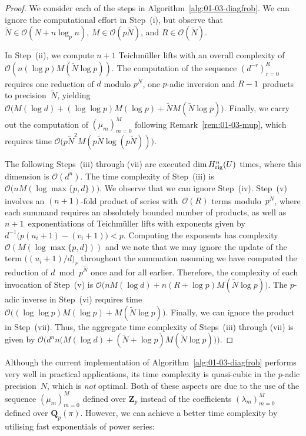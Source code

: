 \begin{proof}
We consider each of the steps in Algorithm~\ref{alg:01-03-diagfrob}. 
We can ignore the computational effort in {Step~(i)}, but observe 
that $\tilde{N} \in \mathcal{O}(N + n \log_p n)$, 
$M \in \mathcal{O}(p \tilde{N})$, and $R \in \mathcal{O}(\tilde{N})$.  

In {Step~(ii)}, we compute $n+1$ Teichm\"uller lifts with an 
overall complexity of $\mathcal{O}(n (\log p) M(\tilde{N} \log p))$. 
The computation of the sequence $(d^{-r})_{r=0}^{R}$ requires 
one reduction of $d$ modulo $p^{\tilde{N}}$, one $p$-adic inversion 
and $R-1$~products to precision~$\tilde{N}$, yielding 
$\mathcal{O}\bigl(M(\log d) + (\log \log p) M(\log p) + \tilde{N} M(\tilde{N} \log p)\bigr)$. 
Finally, we carry out the computation of $(\mu_m)_{m=0}^{M}$ following 
Remark~\ref{rem:01-03-mup}, which requires time 
$\mathcal{O}\bigl(p \tilde{N}^2 M(p \tilde{N} \log(p \tilde{N}))\bigr)$.

The following {Steps~(iii) through (vii)} are executed 
$\dim H_{\text{rig}}^{n}(U)$ times, where this dimension 
is $\mathcal{O}(d^n)$.
The time complexity of {Step~(iii)} is 
$\mathcal{O}\bigl(n M(\log \max\{p,d\})\bigr)$.
We observe that we can ignore {Step~(iv)}.
Step~(v) involves an $(n+1)$-fold product of series 
with~$\mathcal{O}(R)$ terms modulo~$p^{\tilde{N}}$, where each summand 
requires an absolutely bounded number of products, as well as 
$n+1$~exponentiations of Teichm\"uller lifts with exponents given 
by $d^{-1} \bigl(p (u_i+1) - (v_i+1)\bigr) < p$.  Computing the 
exponents has complexity $\mathcal{O}(M(\log \max\{p,d\}))$ and 
we note that we may ignore the update of the term 
\mbox{$\bigl((u_i+1)/d\bigr)_r$} throughout the summation 
assuming we have computed the reduction of $d \bmod{p^{\tilde{N}}}$ 
once and for all earlier.  Therefore, the complexity of each 
invocation of {Step~(v)} is 
$\mathcal{O}\bigl( n M(\log d) + n (R + \log p) M(\tilde{N} \log p)\bigr)$.  
The $p$-adic inverse in {Step~(vi)} requires time 
$\mathcal{O}\bigl((\log \log p) M(\log p) + M(\tilde{N} \log p)\bigr)$.
Finally, we can ignore the product in {Step~(vii)}.  
Thus, the aggregate time complexity of {Steps~(iii)} through {(vii)} 
is given by 
$\mathcal{O}\bigl(d^n n \bigl( M(\log d) + (\tilde{N} + \log p) M(\tilde{N} \log p) \bigr)\bigr)$.
\end{proof}

Although the current implementation of Algorithm~\ref{alg:01-03-diagfrob} 
performs very well in practical applications, its time complexity is 
quasi-cubic in the $p$-adic precision~$N$, which is \emph{not} optimal.  
Both of these aspects are due to the use of the sequence $(\mu_m)_{m=0}^{M}$ 
defined over $\mathbf{Z}_p$ instead of 
the coefficients $(\lambda_m)_{m=0}^{M}$ defined over $\mathbf{Q}_p(\pi)$. 
However, we can achieve a better time complexity by utilising fast 
exponentials of power series:

